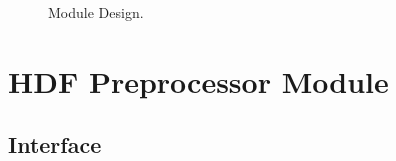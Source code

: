 

\begin{figure}[htb!]
    \centering
    \hspace{5em}%
    \caption{Module Design.}
    \label{fig:module-design}
\end{figure}


\section{HDF Preprocessor Module}
\label{sec:preprocessor-module}

\subsection{Interface}
\label{sec:preprocessor-interface}

